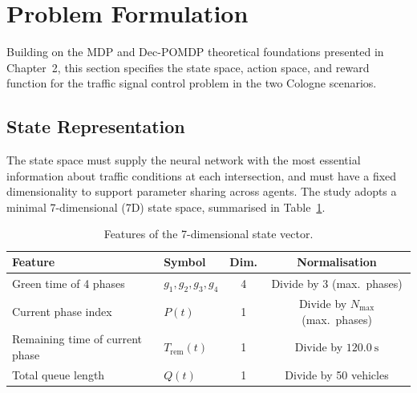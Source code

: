 \section{Problem Formulation}

Building on the MDP and Dec-POMDP theoretical foundations presented in
Chapter~2, this section specifies the state space, action space, and reward
function for the traffic signal control problem in the two Cologne scenarios.

\subsection{State Representation}

The state space must supply the neural network with the most essential
information about traffic conditions at each intersection, and must have a
fixed dimensionality to support parameter sharing across agents. The study
adopts a minimal 7-dimensional (7D) state space, summarised in
Table~\ref{tab:state}.

\begin{table}[htbp]
    \caption{Features of the 7-dimensional state vector.}
    \label{tab:state}
    \centering
    \begin{tabular}{llcc}
        \toprule
        \textbf{Feature} & \textbf{Symbol} & \textbf{Dim.}
            & \textbf{Normalisation} \\
        \midrule
        Green time of 4 phases
            & $g_1,g_2,g_3,g_4$  & 4
            & Divide by 3 (max.\ phases) \\
        Current phase index
            & $P(t)$             & 1
            & Divide by $N_\mathrm{max}$ (max.\ phases) \\
        Remaining time of current phase
            & $T_\mathrm{rem}(t)$& 1
            & Divide by $120.0\ \text{s}$ \\
        Total queue length
            & $Q(t)$             & 1
            & Divide by 50 vehicles \\
        \bottomrule
    \end{tabular}
\end{table}

